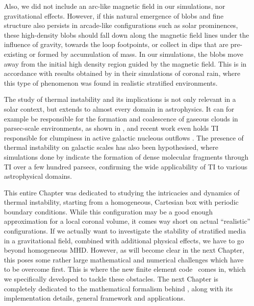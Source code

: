 Also, we did not include an arc-like magnetic field in our simulations, nor gravitational effects. However, if this natural emergence of blobs and fine structure also persists in arcade-like configurations such as solar prominences, these high-density blobs should fall down along the magnetic field lines under the influence of gravity, towards the loop footpoints, or collect in dips that are pre-existing or formed by accumulation of mass. In our simulations, the blobs move away from the initial high density region guided by the magnetic field. This is in accordance with results obtained by \citet{xia2017} in their simulations of coronal rain, where this type of phenomenon was found in realistic stratified environments.

The study of thermal instability and its implications is not only relevant in a solar context, but extends to almost every domain in astrophysics. It can for example be responsible for the formation and coalescence of gaseous clouds in parsec-scale environments, as shown in \citet{waters2019}, and recent work even holds TI responsible for clumpiness in active galactic nucleous outflows \citep{dannen2020}. The presence of thermal instability on galactic scales has also been hypothesised, where simulations done by \citet{peng2017} indicate the formation of dense molecular fragments through TI over a few hundred parsecs, confirming the wide applicability of TI to various astrophysical domains.

This entire Chapter was dedicated to studying the intricacies and dynamics of thermal instability, starting from a homogeneous, Cartesian box with periodic boundary conditions. While this configuration may be a good enough approximation for a local coronal volume, it comes way short on actual ``realistic'' configurations. If we actually want to investigate the stability of stratified media in a gravitational field, combined with additional physical effects, we have to go beyond homogeneous MHD. However, as will become clear in the next Chapter, this poses some rather large mathematical and numerical challenges which have to be overcome first. This is where the new finite element code \legolas~comes in, which we specifically developed to tackle these obstacles. The next Chapter is completely dedicated to the mathematical formalism behind \legolas, along with its implementation details, general framework and applications.

\cleardoublepage
